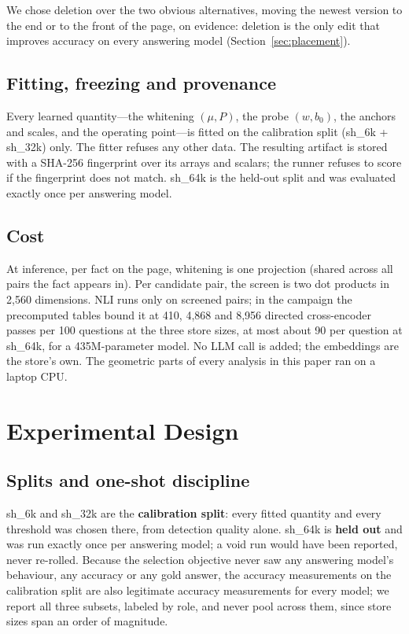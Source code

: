 \documentclass[journal=jcisd8,manuscript=article]{achemso}
\begin{document}
We chose deletion over the two obvious alternatives, moving the newest version to the end or to the front of the page, on evidence: deletion is the only edit that improves accuracy on every answering model (Section~\ref{sec:placement}).

\subsection{Fitting, freezing and provenance}

Every learned quantity---the whitening $(\mu,P)$, the probe $(w,b_0)$, the anchors and scales, and the operating point---is fitted on the calibration split (sh\_6k + sh\_32k) only. The fitter refuses any other data. The resulting artifact is stored with a SHA-256 fingerprint over its arrays and scalars; the runner refuses to score if the fingerprint does not match. sh\_64k is the held-out split and was evaluated exactly once per answering model.

\subsection{Cost}

At inference, per fact on the page, whitening is one projection (shared across all pairs the fact appears in). Per candidate pair, the screen is two dot products in 2,560 dimensions. NLI runs only on screened pairs; in the campaign the precomputed tables bound it at 410, 4,868 and 8,956 directed cross-encoder passes per 100 questions at the three store sizes, at most about 90 per question at sh\_64k, for a 435M-parameter model. No LLM call is added; the embeddings are the store's own. The geometric parts of every analysis in this paper ran on a laptop CPU.

\section{Experimental Design}
\label{sec:design}

\subsection{Splits and one-shot discipline}
\label{sec:splits}

sh\_6k and sh\_32k are the \textbf{calibration split}: every fitted quantity and every threshold was chosen there, from detection quality alone. sh\_64k is \textbf{held out} and was run exactly once per answering model; a void run would have been reported, never re-rolled. Because the selection objective never saw any answering model's behaviour, any accuracy or any gold answer, the accuracy measurements on the calibration split are also legitimate accuracy measurements for every model; we report all three subsets, labeled by role, and never pool across them, since store sizes span an order of magnitude.
\end{document}
